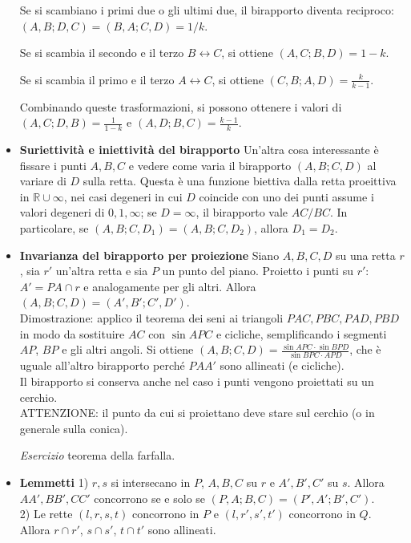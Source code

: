\begin{itemize}
Se si scambiano i primi due o gli ultimi due, il birapporto diventa reciproco: $(A,B;D,C)=(B,A;C,D)=1/k$.

Se si scambia il secondo e il terzo $B \leftrightarrow C$, si ottiene $(A,C;B,D)=1-k$.

Se si scambia il primo e il terzo $A \leftrightarrow C$, si ottiene $(C,B;A,D)=\frac{k}{k-1}$.


Combinando queste trasformazioni, si possono ottenere i valori di $(A,C;D,B)=\frac{1}{1-k}$ e $(A,D;B,C)=\frac{k-1}{k}$.

\item \textbf{Suriettività e iniettività del birapporto} Un'altra cosa interessante è fissare i punti $A,B,C$ e vedere come varia il birapporto $(A,B;C,D)$ al variare di $D$ sulla retta. Questa è una funzione biettiva dalla retta proeittiva in $\mathbb{R}\cup\infty$, nei casi degeneri in cui $D$ coincide con uno dei punti assume i valori degeneri di $0,1,\infty$; se $D=\infty$, il birapporto vale $AC/BC$. In particolare, se $(A,B;C,D_1)=(A,B;C,D_2)$, allora $D_1=D_2$.

\item \textbf{Invarianza del birapporto per proiezione} Siano $A,B,C,D$ su una retta $r$, sia $r'$ un'altra retta e sia $P$ un punto del piano. Proietto i punti su $r'$: $A'=PA\cap r$ e analogamente per gli altri. Allora $(A,B;C,D)=(A',B';C',D')$.\\
Dimostrazione: applico il teorema dei seni ai triangoli $PAC,PBC,PAD,PBD$ in modo da sostituire $AC$ con $\sin APC$ e cicliche, semplificando i segmenti $AP$, $BP$ e gli altri angoli. Si ottiene $(A,B;C,D)=\frac{\sin APC \cdot \sin BPD}{\sin BPC \cdot APD}$, che è uguale all'altro birapporto perché $PAA'$ sono allineati (e cicliche).\\
Il birapporto si conserva anche nel caso i punti vengono proiettati su un cerchio.\\
ATTENZIONE: il punto da cui si proiettano deve stare sul cerchio (o in generale sulla conica). 

\textit{Esercizio} teorema della farfalla.

\item \textbf{Lemmetti} 1) $r,s$ si intersecano in $P$, $A,B,C$ su $r$ e $A',B',C'$ su $s$. Allora $AA',BB',CC'$ concorrono se e solo se $(P,A;B,C)=(P',A';B',C')$.\\
2) Le rette $(l,r,s,t)$ concorrono in $P$ e $(l,r',s',t')$ concorrono in $Q$. Allora $r\cap r'$, $s \cap s'$, $t\cap t'$ sono allineati.


\end{itemize}
